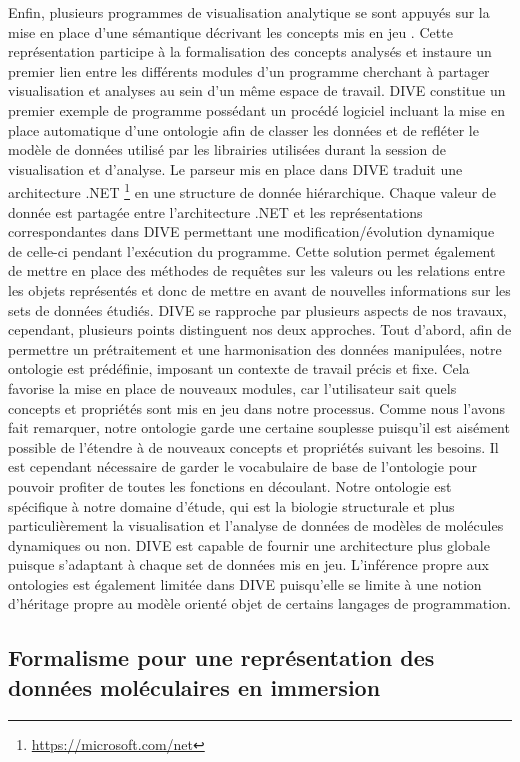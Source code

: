 Enfin, plusieurs programmes de visualisation analytique se sont appuyés sur la mise en place d'une sémantique décrivant les concepts mis en jeu \cite{rysavy_dive:_2014}. Cette représentation participe à la formalisation des concepts analysés et instaure un premier lien entre les différents modules d'un programme cherchant à partager visualisation et analyses au sein d'un même espace de travail. DIVE constitue un premier exemple de programme possédant un procédé logiciel incluant la mise en place automatique d'une ontologie afin de classer les données et de refléter le modèle de données utilisé par les librairies utilisées durant la session de visualisation et d'analyse. Le parseur mis en place dans DIVE traduit une architecture .NET \footnote{\url{https://microsoft.com/net}} en une structure de donnée hiérarchique. Chaque valeur de donnée est partagée entre l'architecture .NET et les représentations correspondantes dans DIVE permettant une modification/évolution dynamique de celle-ci pendant l’exécution du programme. Cette solution permet également de mettre en place des méthodes de requêtes sur les valeurs ou les relations entre les objets représentés et donc de mettre en avant de nouvelles informations sur les sets de données étudiés. DIVE se rapproche par plusieurs aspects de nos travaux, cependant, plusieurs points distinguent nos deux approches. Tout d'abord, afin de permettre un prétraitement et une harmonisation des données manipulées, notre ontologie est prédéfinie, imposant un contexte de travail précis et fixe. Cela favorise la mise en place de nouveaux modules, car l'utilisateur sait quels concepts et propriétés sont mis en jeu dans notre processus. Comme nous l'avons fait remarquer, notre ontologie garde une certaine souplesse puisqu'il est aisément possible de l'étendre à de nouveaux concepts et propriétés suivant les besoins. Il est cependant nécessaire de garder le vocabulaire de base de l'ontologie pour pouvoir profiter de toutes les fonctions en découlant. Notre ontologie est spécifique à notre domaine d'étude, qui est la biologie structurale et plus particulièrement la visualisation et l'analyse de données de modèles de molécules dynamiques ou non. DIVE est capable de fournir une architecture plus globale puisque s'adaptant à chaque set de données mis en jeu. L'inférence propre aux ontologies est également limitée dans DIVE puisqu'elle se limite à une notion d'héritage propre au modèle orienté objet de certains langages de programmation.

\subsection{Formalisme pour une représentation des données moléculaires en immersion}


